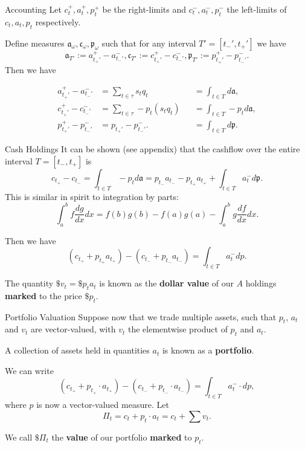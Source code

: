 \documentclass{beamer}
\begin{document}
\begin{frame}{Accounting}
	Let $c_t^+, a_t^+, p_t^+$ be the right-limits and $c_t^-, a_t^-, p_t^-$ the left-limits of $c_t,a_t, p_t$ respectively.

	\pause

	Define measures $\mathfrak{a}_\omega, \mathfrak{c}_\omega, \mathfrak{p}_\omega$ such that for any interval $T'=[t_-',t_+']$ we have
	$$\mathfrak{a}_{T'} := a_{t_+'}^+-a_{t_-'}^-, \mathfrak{c}_{T'} := c_{t_+'}^+-c_{t_-'}^-, \mathfrak{p}_{T'} := p_{t_+'}^+-p_{t_-'}^-.$$
	Then we have

	\vspace{-0.06\textheight}
	\begin{align*}
		a_{t_+'}^+ - a_{t_-'}^-	&= \sum_{t\in \tau} s_t q_t		&&= \int_{t\in T} d\mathfrak{a},
	\\	c_{t_+'}^+ - c_{t_-'}^-	&= \sum_{t\in \tau} - p_t (s_t q_t)	&&= \int_{t\in T} - p_t d\mathfrak{a},
	\\	p_{t_+'}^+ - p_{t_-'}^- &= p_{t_+'} - p_{t_-'}^-.		&&= \int_{t\in T} d\mathfrak{p}.
	\end{align*}%
\end{frame}

\begin{frame}{Cash Holdings}
	It can be shown (see appendix) that the cashflow over the entire interval $T=[t_-,t_+]$ is
	$$c_{t_+} - c_{t_-} = \int_{t\in T} - p_t d\mathfrak{a} = p_{t_-}a_{t_-} - p_{t_+}a_{t_+} + \int_{t\in T} a_t^- d\mathfrak{p}.$$
	This is similar in spirit to integration by parts:
	$$\int_a^b f \frac{dg}{dx} dx = f(b)g(b)-f(a)g(a) - \int_a^b g \frac{df}{dx} dx.$$

	Then we have
	$$(c_{t_+} + p_{t_+}a_{t_+}) - (c_{t_-} + p_{t_-}a_{t_-}) = \int_{t\in T} a_t^- dp.$$

	The quantity $\$v_t = \$p_t a_t$ is known as the \textbf{dollar value} of our $A$ holdings \textbf{marked} to the price $\$p_t$.%
\end{frame}

\begin{frame}{Portfolio Valuation}
	Suppose now that we trade multiple assets, such that $p_t$, $a_t$ and $v_t$ are vector-valued, with $v_t$ the elementwise product of $p_t$ and $a_t$.

	A collection of assets held in quantities $a_t$ is known as a \textbf{portfolio}.

	\pause

	We can write
	$$(c_{t_+} + p_{t_+} \cdot a_{t_+}) - (c_{t_-} + p_{t_-} \cdot a_{t_-}) = \int_{t\in T} a_t^- \cdot dp,$$
	where $p$ is now a vector-valued measure. \pause Let
	$$\Pi_t	= c_t + p_t\cdot a_t = c_t + \sum v_t.$$

	We call $\$\Pi_t$ the \textbf{value} of our portfolio \textbf{marked} to $p_t$.
\end{frame}
\end{document}
